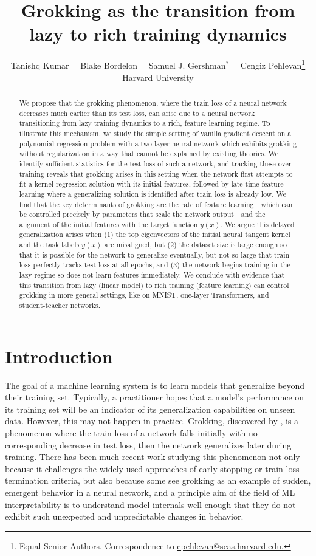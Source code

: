 \documentclass{article} %
\author{Tanishq Kumar \ \ Blake Bordelon \ \ Samuel J. Gershman$^*$ \ \ Cengiz Pehlevan\thanks{Equal Senior Authors. Correspondence to \href{mailto:cpehlevan@seas.harvard.edu}{cpehlevan@seas.harvard.edu.}}
\\
Harvard University 
}
\title{Grokking as the transition from lazy to rich training dynamics}
\begin{document}
\maketitle

\begin{abstract}
 We propose that the grokking phenomenon, where the train loss of a neural network decreases much earlier than its test loss, can arise due to a neural network transitioning from lazy training dynamics to a rich, feature learning regime. To illustrate this mechanism, we study the simple setting of vanilla gradient descent on a polynomial regression problem with a two layer neural network which exhibits grokking without regularization in a way that cannot be explained by existing theories. We identify sufficient statistics for the test loss of such a network, and tracking these over training reveals that grokking arises in this setting when the network first attempts to fit a kernel regression solution with its initial features, followed by late-time feature learning where a generalizing solution is identified after train loss is already low. We find that the key determinants of grokking are the rate of feature learning---which can be controlled precisely by parameters that scale the network output---and the alignment of the initial features with the target function $y(x)$. We argue this delayed generalization arises when (1) the top eigenvectors of the initial neural tangent kernel and the task labels $y(x)$ are misaligned, but (2) the dataset size is large enough so that it is possible for the network to generalize eventually, but not so large that train loss perfectly tracks test loss at all epochs, and (3) the network begins training in the lazy regime so does not learn features immediately. We conclude with evidence that this transition from lazy (linear model) to rich training (feature learning) can control grokking in more general settings, like on MNIST, one-layer Transformers, and student-teacher networks.
\end{abstract}


\section{Introduction}

The goal of a machine learning system is to learn models that generalize beyond their training set. Typically, a practitioner hopes that a model's performance on its training set will be an indicator of its generalization capabilities on unseen data. However, this may not happen in practice. Grokking, discovered by \cite{power2022grokking}, is a phenomenon where the train loss of a network falls initially with no corresponding decrease in test loss, then the network generalizes later during training. There has been much recent work studying this phenomenon not only because it challenges the widely-used approaches of early stopping or train loss termination criteria, but also because some \cite{nanda2023progress} see grokking as an example of sudden, emergent behavior in a neural network, and a principle aim of the field of ML interpretability is to understand model internals well enough that they do not exhibit such unexpected and unpredictable changes in behavior.
\end{document}
